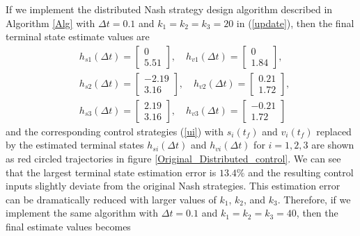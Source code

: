 \documentclass[10pt,doublecolumn]{IEEEtran}  %
\begin{document}
If we implement the distributed Nash strategy design algorithm described in Algorithm \ref{Alg} with $\Delta t=0.1$ and $k_1=k_2=k_3=20$ in (\ref{update}), then the final terminal state estimate values are
\begin{align*}
&h_{s1}(\Delta t)=\begin{bmatrix}
 0\\
    5.51
\end{bmatrix},\quad h_{v1}(\Delta t)=\begin{bmatrix}
  0\\
    1.84
\end{bmatrix},\\
&h_{s2}(\Delta t)=\begin{bmatrix}
 -2.19\\    3.16
\end{bmatrix},\quad h_{v2}(\Delta t)=\begin{bmatrix}
 0.21\\1.72
\end{bmatrix},\\
&h_{s3}(\Delta t)=\begin{bmatrix}
 2.19\\3.16
\end{bmatrix},\quad h_{v3}(\Delta t)=\begin{bmatrix}
-0.21\\    1.72
\end{bmatrix}
\end{align*}
and the corresponding control strategies (\ref{ui}) with $s_i(t_f)$ and $v_i(t_f)$ replaced by the estimated terminal states $h_{si}(\Delta t)$ and $h_{vi}(\Delta t)$ for $i=1,2,3$ are shown as red circled trajectories in figure \ref{Original_Distributed_control}. We can see that the largest terminal state estimation error is $13.4\%$ and the resulting control inputs slightly deviate from the original Nash strategies. This estimation error can be dramatically reduced with larger values of $k_1$, $k_2$, and $k_3$. Therefore, if we implement the same algorithm with $\Delta t=0.1$ and $k_1=k_2=k_3=40$, then the final estimate values becomes
\end{document}
